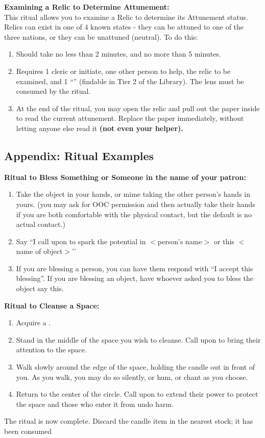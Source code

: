 \documentclass[green]{GL2020}
\begin{document}
\textbf{Examining a Relic to Determine Attunement:}\\
This ritual allows you to examine a Relic to determine its Attunement status. Relics can exist in one of 4 known states - they can be attuned to one of the three nations, or they can be unattuned (neutral). To do this:
  \begin{enumerate}
    \item Should take no less than 2 minutes, and no more than 5 minutes.
    \item Requires 1 cleric or initiate, one other person to help, the relic to be examined, and 1 ``\iCrystalLens{}'' (findable in Tier 2 of the Library). The lens must be consumed by the ritual. 
    \item At the end of the ritual, you may open the relic and pull out the paper inside to read the current attunement. Replace the paper immediately, without letting anyone else read it \textbf{(not even your helper).}
  \end{enumerate}
   

\subsection*{Appendix: Ritual Examples}

\textbf{Ritual to Bless Something or Someone in the name of your patron:}
  \begin{enumerate}
    \item Take the object in your hands, or mime taking the other person’s hands in yours. (you may ask for OOC permission and then actually take their hands if you are both comfortable with the physical contact, but the default is no actual contact.)
    \item Say ``I call upon \cTechGod{} to spark the potential in $<$person’s name$>$ or this $<$ name of object$>$’’
    \item If you are blessing a person, you can have them respond with ``I accept this blessing''. If you are blessing an object, have whoever asked you to bless the object say this.
  \end{enumerate}

\textbf{Ritual to Cleanse a Space:}
  \begin{enumerate}
    \item Acquire a \iRitualCandle{}.
    \item Stand in the middle of the space you wish to cleanse. Call upon \cFarmGod{} to bring their attention to the space.
    \item Walk slowly around the edge of the space, holding the candle out in front of you. As you walk, you may do so silently, or hum, or chant as you choose.
    \item Return to the center of the circle. Call upon \cTechGod{} to extend their power to protect the space and those who enter it from undo harm.
  \end{enumerate}
The ritual is now complete. Discard the candle item in the nearest stock; it has been consumed
   
\end{document}
